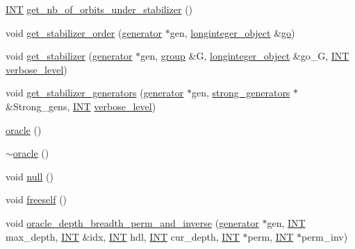 \begin{DoxyCompactItemize}
\item 
\mbox{\hyperlink{galois_8h_a09fddde158a3a20bd2dcadb609de11dc}{I\+NT}} \mbox{\hyperlink{classoracle_a58802a2227605c5fb697bd1196fdecd1}{get\+\_\+nb\+\_\+of\+\_\+orbits\+\_\+under\+\_\+stabilizer}} ()
\item 
void \mbox{\hyperlink{classoracle_aa3e1c014a85faf719d8ba33f38189d56}{get\+\_\+stabilizer\+\_\+order}} (\mbox{\hyperlink{classgenerator}{generator}} $\ast$gen, \mbox{\hyperlink{classlonginteger__object}{longinteger\+\_\+object}} \&\mbox{\hyperlink{simeon_8_c_a1516b736c8ebbfb03a9dd7d8826cd9a6}{go}})
\item 
void \mbox{\hyperlink{classoracle_a66344906577c7688e2e5f3d0c5748d2c}{get\+\_\+stabilizer}} (\mbox{\hyperlink{classgenerator}{generator}} $\ast$gen, \mbox{\hyperlink{classgroup}{group}} \&G, \mbox{\hyperlink{classlonginteger__object}{longinteger\+\_\+object}} \&go\+\_\+G, \mbox{\hyperlink{galois_8h_a09fddde158a3a20bd2dcadb609de11dc}{I\+NT}} \mbox{\hyperlink{simeon_8_c_a818073fbcc2f439e7c56952f67386122}{verbose\+\_\+level}})
\item 
void \mbox{\hyperlink{classoracle_a55d6b99a05f74278f7cb0e9d9761da24}{get\+\_\+stabilizer\+\_\+generators}} (\mbox{\hyperlink{classgenerator}{generator}} $\ast$gen, \mbox{\hyperlink{classstrong__generators}{strong\+\_\+generators}} $\ast$\&Strong\+\_\+gens, \mbox{\hyperlink{galois_8h_a09fddde158a3a20bd2dcadb609de11dc}{I\+NT}} \mbox{\hyperlink{simeon_8_c_a818073fbcc2f439e7c56952f67386122}{verbose\+\_\+level}})
\item 
\mbox{\hyperlink{classoracle_ad561602c9076eb46eebce4defa982caf}{oracle}} ()
\item 
\mbox{\hyperlink{classoracle_abb19e0e90f7ab76bf56bd3353e32518d}{$\sim$oracle}} ()
\item 
void \mbox{\hyperlink{classoracle_ae12c76830318ec2d4f6c2a77da98bb55}{null}} ()
\item 
void \mbox{\hyperlink{classoracle_a809f2f45c76a4289aca3d22d05fcacc1}{freeself}} ()
\item 
void \mbox{\hyperlink{classoracle_aa8a32b267e874282452dc84bdb5eeb31}{oracle\+\_\+depth\+\_\+breadth\+\_\+perm\+\_\+and\+\_\+inverse}} (\mbox{\hyperlink{classgenerator}{generator}} $\ast$gen, \mbox{\hyperlink{galois_8h_a09fddde158a3a20bd2dcadb609de11dc}{I\+NT}} max\+\_\+depth, \mbox{\hyperlink{galois_8h_a09fddde158a3a20bd2dcadb609de11dc}{I\+NT}} \&idx, \mbox{\hyperlink{galois_8h_a09fddde158a3a20bd2dcadb609de11dc}{I\+NT}} hdl, \mbox{\hyperlink{galois_8h_a09fddde158a3a20bd2dcadb609de11dc}{I\+NT}} cur\+\_\+depth, \mbox{\hyperlink{galois_8h_a09fddde158a3a20bd2dcadb609de11dc}{I\+NT}} $\ast$perm, \mbox{\hyperlink{galois_8h_a09fddde158a3a20bd2dcadb609de11dc}{I\+NT}} $\ast$perm\+\_\+inv)

\end{DoxyCompactItemize}
